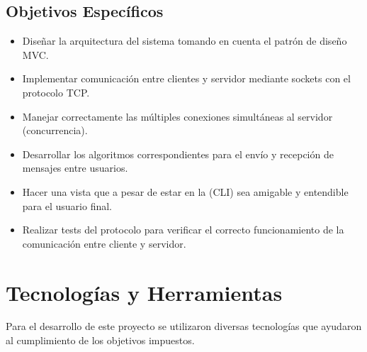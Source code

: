 \documentclass[12pt]{article}
\begin{document}
\subsection{Objetivos Específicos}
\begin{itemize}
    \item Diseñar la arquitectura del sistema tomando en cuenta el patrón de diseño MVC.
    \item Implementar comunicación entre clientes y servidor mediante sockets con el protocolo TCP.
    \item Manejar correctamente las múltiples conexiones simultáneas al servidor (concurrencia).
    \item Desarrollar los algoritmos correspondientes para el envío y recepción de mensajes entre usuarios.
    \item Hacer una vista que a pesar de estar en la (CLI) sea amigable y entendible para el usuario final.
    \item Realizar tests del protocolo para verificar el correcto funcionamiento de la comunicación entre cliente y servidor.      
\end{itemize}

\section{Tecnologías y Herramientas}

Para el desarrollo de este proyecto se utilizaron diversas tecnologías que ayudaron al cumplimiento de los objetivos impuestos.
\end{document}
